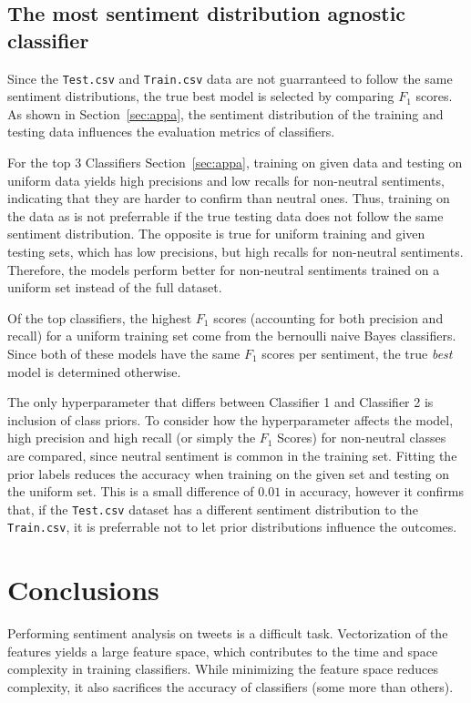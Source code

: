\documentclass[11pt]{article}
\begin{document}
\subsection{The most sentiment distribution agnostic classifier}

Since the \texttt{Test.csv} and \texttt{Train.csv} data are not guarranteed to follow the same sentiment distributions,
the true best model is selected by comparing $F_1$ scores.
As shown in Section~\ref{sec:appa}, the sentiment distribution of the training and testing data influences the evaluation metrics of classifiers.

For the top 3 Classifiers Section~\ref{sec:appa}, %
training on given data and testing on uniform data yields high precisions and low recalls for non-neutral sentiments,
indicating that they are harder to confirm than neutral ones.
Thus, training on the data as is not preferrable if the true testing data does not follow the same sentiment distribution.
The opposite is true for uniform training and given testing sets, which has low precisions, but high recalls for non-neutral sentiments.
Therefore, the models perform better for non-neutral sentiments trained on a uniform set instead of the full dataset.

Of the top classifiers, 
the highest $F_1$ scores (accounting for both precision and recall) for a uniform training set come from the bernoulli naive Bayes classifiers. 
Since both of these models have the same $F_1$ scores per sentiment, the true \emph{best} model is determined otherwise.

The only hyperparameter that differs between Classifier 1 and Classifier 2 is inclusion of class priors.
To consider how the hyperparameter affects the model, 
high precision and high recall (or simply the $F_1$ Scores) for non-neutral classes are compared, 
since neutral sentiment is common in the training set.
Fitting the prior labels reduces the accuracy when training on the given set and testing on the uniform set.
This is a small difference of $0.01$ in accuracy, however it confirms that, 
if the \texttt{Test.csv} dataset has a different sentiment distribution to the \texttt{Train.csv}, it is preferrable not to let prior distributions influence the outcomes.


\section{Conclusions}
Performing sentiment analysis on tweets is a difficult task.
Vectorization of the features yields a large feature space, which contributes to the time and space complexity in training classifiers.
While minimizing the feature space reduces complexity, it also sacrifices the accuracy of classifiers (some more than others).
\end{document}
